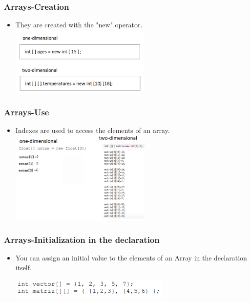 \documentclass[11pt]{beamer}
\begin{document}
\begin{frame}
\frametitle{Arrays-Creation}
\begin{itemize}
\item They are created with the "new" operator.
\
{\includegraphics[width=7.0cm]{img/creation.png}}
\end{itemize}
\end{frame}

\begin{frame}
\frametitle{Arrays-Use}
\begin{itemize}
\item Indexes are used to access the elements of an array.
\
{\includegraphics[width=7.0cm]{img/Arrays.png}}
\end{itemize}
\end{frame}

\begin{frame}
\frametitle{Arrays-Initialization in the declaration}
\begin{itemize}
\item You can assign an initial value to the elements of an Array in the declaration itself.

\centering
{\includegraphics[width=8.0cm]{img/Inice.png}}
\end{itemize}
\end{frame}
\end{document}
